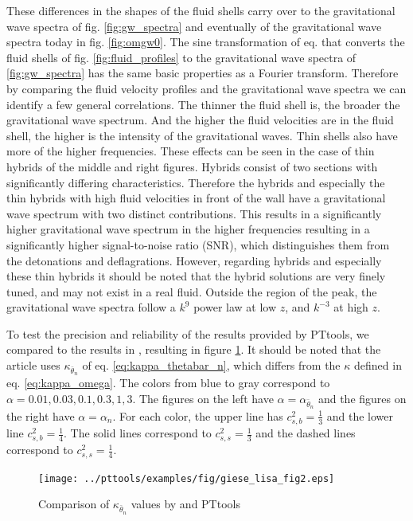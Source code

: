 These differences in the shapes of the fluid shells carry over to the gravitational wave spectra of fig. \ref{fig:gw_spectra} and eventually of the gravitational wave spectra today in fig. \ref{fig:omgw0}.
The sine transformation of eq.  that converts the fluid shells of fig. \ref{fig:fluid_profiles} to the gravitational wave spectra of \ref{fig:gw_spectra} has the same basic properties as a Fourier transform.
Therefore by comparing the fluid velocity profiles and the gravitational wave spectra we can identify a few general correlations.
The thinner the fluid shell is, the broader the gravitational wave spectrum.
And the higher the fluid velocities are in the fluid shell, the higher is the intensity of the gravitational waves.
Thin shells also have more of the higher frequencies.
These effects can be seen in the case of thin hybrids of the middle and right figures.
Hybrids consist of two sections with significantly differing characteristics.
Therefore the hybrids and especially the thin hybrids with high fluid velocities in front of the wall have a gravitational wave spectrum with two distinct contributions.
This results in a significantly higher gravitational wave spectrum in the higher frequencies resulting in a significantly higher signal-to-noise ratio (SNR),
which distinguishes them from the detonations and deflagrations.
However, regarding hybrids and especially these thin hybrids
it should be noted that the hybrid solutions are very finely tuned, and may not exist in a real fluid.
\cite[p. 5]{gowling_lisa_2021}
Outside the region of the peak, the gravitational wave spectra follow a $k^9$ power law at low $z$,
and $k^{-3}$ at high $z$.

To test the precision and reliability of the results provided by PTtools,
we compared to the results in \cite[fig. 2]{giese_2021},
resulting in figure \ref{fig:kappa_giese}.
It should be noted that the article uses $\kappa_{\bar{\theta}_n}$ of eq. \eqref{eq:kappa_thetabar_n},
which differs from the $\kappa$ defined in eq. \eqref{eq:kappa_omega}.
The colors from blue to gray correspond to $\alpha = 0.01, 0.03, 0.1, 0.3, 1, 3$.
The figures on the left have $\alpha = \alpha_{\bar{\theta}_n}$
and the figures on the right have $\alpha = \alpha_n$.
For each color, the upper line has $c_{s,b}^2 = \frac{1}{3}$ and the lower line $c_{s,b}^2 = \frac{1}{4}$.
The solid lines correspond to $c_{s,s}^2 = \frac{1}{3}$ and the dashed lines correspond to $c_{s,s}^2 = \frac{1}{4}$.

\begin{figure}[ht!]
\centering
\texttt{[image: ../pttools/examples/fig/giese\_lisa\_fig2.eps]}
\caption{Comparison of $\kappa_{\bar{\theta}_n}$ values by \cite[fig. 2]{giese_2021} and PTtools}
\label{fig:kappa_giese}
\end{figure}

